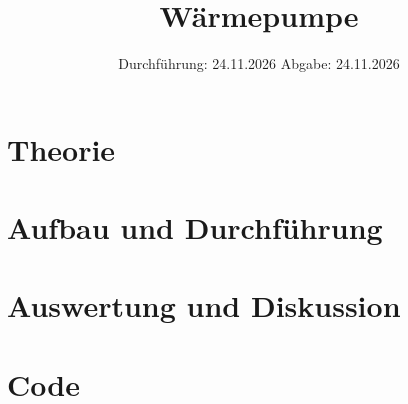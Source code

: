 


\subject{VERSUCH 206}
\title{Wärmepumpe}
\date{%
  Durchführung: 24.11.2026
  \hspace{3em}
  Abgabe: 24.11.2026
}
\usepackage{subcaption}
\usepackage[section, below]{placeins}
\usepackage[]{caption} %
\usepackage{comment}
\FloatBarrier


\maketitle
\thispagestyle{empty}
\tableofcontents
\newpage
\section{Theorie}

\section{Aufbau und Durchführung}

\section{Auswertung und Diskussion}

\printbibliography{}
\section{Code}
\inputminted{python3}{v206/v206.py}
  